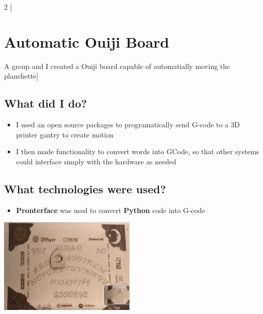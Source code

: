 \documentclass{article}
\begin{document}
\newpage
\begin{multicols}{2}
    [\section*{Automatic Ouiji Board}
    A group and I created a Ouiji board capable of automatially moving the planchette]
    
    \subsection*{What did I do?}
    \begin{itemize}
        \item I used an open source packages to programatically send G-code to a 3D printer gantry to create motion
        \item I then made functionality to convert words into GCode, so that other systems could interface simply with the hardware as needed
    \end{itemize}
    \subsection*{What technologies were used?}
    \begin{itemize}
        \item \textbf{Pronterface} was used to convert \textbf{Python} code into G-code
    \end{itemize}
    \begin{center}
        \includegraphics[width=0.49\textwidth]{images/ouija_board.png}
    \end{center}
\end{multicols}
\end{document}
